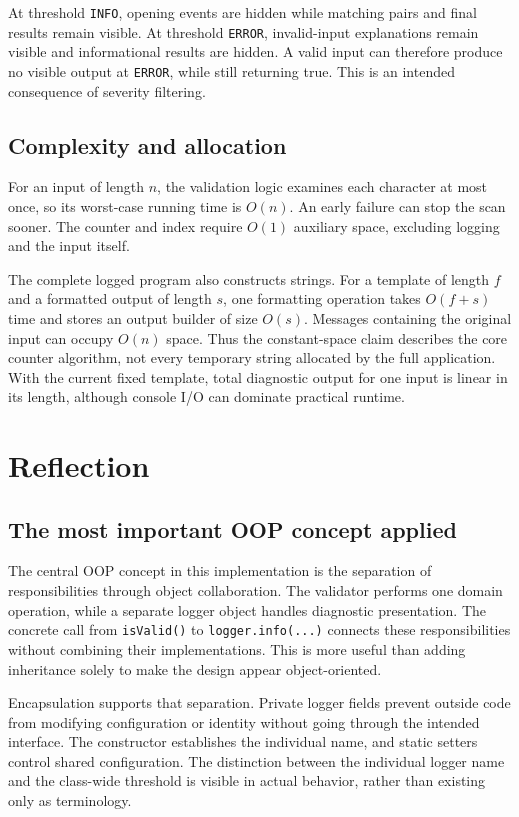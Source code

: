 \documentclass[12pt,a4paper]{article}
\newcommand{\code}[1]{\texttt{#1}}
\begin{document}
At threshold \code{INFO}, opening events are hidden while matching pairs and final results remain visible. At threshold \code{ERROR}, invalid-input explanations remain visible and informational results are hidden. A valid input can therefore produce no visible output at \code{ERROR}, while still returning true. This is an intended consequence of severity filtering.

\subsection{Complexity and allocation}
For an input of length $n$, the validation logic examines each character at most once, so its worst-case running time is $O(n)$. An early failure can stop the scan sooner. The counter and index require $O(1)$ auxiliary space, excluding logging and the input itself.

The complete logged program also constructs strings. For a template of length $f$ and a formatted output of length $s$, one formatting operation takes $O(f+s)$ time and stores an output builder of size $O(s)$. Messages containing the original input can occupy $O(n)$ space. Thus the constant-space claim describes the core counter algorithm, not every temporary string allocated by the full application. With the current fixed template, total diagnostic output for one input is linear in its length, although console I/O can dominate practical runtime.

\section{Reflection}
\subsection{The most important OOP concept applied}
The central OOP concept in this implementation is the separation of responsibilities through object collaboration. The validator performs one domain operation, while a separate logger object handles diagnostic presentation. The concrete call from \code{isValid()} to \code{logger.info(...)} connects these responsibilities without combining their implementations. This is more useful than adding inheritance solely to make the design appear object-oriented.

Encapsulation supports that separation. Private logger fields prevent outside code from modifying configuration or identity without going through the intended interface. The constructor establishes the individual name, and static setters control shared configuration. The distinction between the individual logger name and the class-wide threshold is visible in actual behavior, rather than existing only as terminology.
\end{document}
